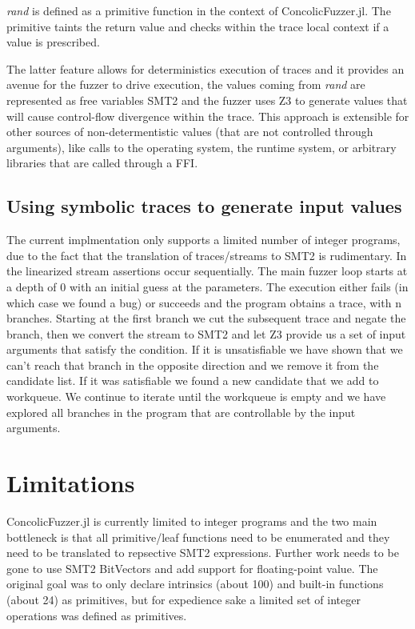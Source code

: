 \documentclass{article} %
\begin{document}
\emph{rand} is defined as a primitive function in the context of ConcolicFuzzer.jl. The primitive taints
the return value and checks within the trace local context if a value is prescribed.

The latter feature allows for deterministics execution of traces and it provides an avenue for the fuzzer to
drive execution, the values coming from \emph{rand} are represented as free variables SMT2 and the fuzzer uses
Z3 to generate
values that will cause control-flow divergence within the trace. This approach is extensible for other sources
of non-determentistic values (that are not controlled through arguments), like calls to the operating system,
 the runtime system, or arbitrary libraries that are called through a FFI.

\subsection{Using symbolic traces to generate input values}
The current implmentation only supports a limited number of integer programs, due to the fact
that the translation of traces/streams to SMT2 is rudimentary. In the linearized stream assertions
occur sequentially. The main fuzzer loop starts at a depth of 0 with an initial guess at the parameters.
The execution either fails (in which case we found a bug) or succeeds and the program obtains a trace,
with n branches. Starting at the first branch we cut the subsequent trace and negate the branch, then we
convert the stream to SMT2 and let Z3 provide us a set of input arguments that satisfy the condition.
If it is unsatisfiable we have shown that we can't reach that branch in the opposite direction and we
remove it from the candidate list. If it was satisfiable we found a new candidate that we add to workqueue.
We continue to iterate until the workqueue is empty and we have explored all branches in the program that
are controllable by the input arguments.

\section{Limitations}
\label{sec:Limitations}
ConcolicFuzzer.jl is currently limited to integer programs and the two main bottleneck is that all primitive/leaf
functions need to be enumerated and they need to be translated to repsective SMT2 expressions. Further work needs
to be gone to use SMT2 BitVectors and add support for floating-point value. The original goal was to only
declare intrinsics (about 100) and built-in functions (about 24) as primitives, but for expedience sake a limited
set of integer operations was defined as primitives.
\end{document}

